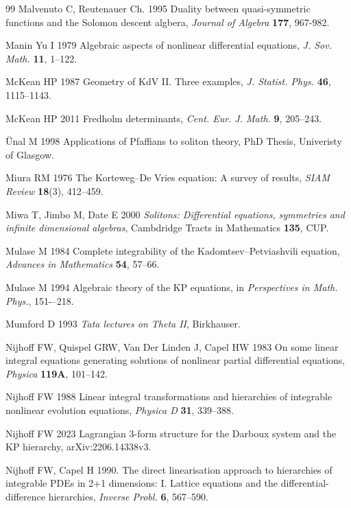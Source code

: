 \documentclass[5p,twocolumn]{elsarticle}
\begin{document}
\begin{thebibliography}{99}
 Malvenuto C, Reutenauer Ch. 1995 Duality between quasi-symmetric functions and the Solomon descent algbera, \textit{Journal of Algebra} \textbf{177}, 967-982.
  
 Manin Yu I 1979 Algebraic aspects of nonlinear differential equations, \textit{J. Sov. Math.} \textbf{11}, 1--122.


 McKean HP 1987 Geometry of KdV II. Three examples, \textit{J. Statist. Phys.\/} \textbf{46}, 1115--1143.  

 McKean HP 2011 Fredholm determinants, \textit{Cent. Eur. J. Math.\/} \textbf{9}, 205--243.

 \"Unal M 1998 Applications of Pfaffians to soliton theory, PhD Thesis, Univeristy of Glasgow.

 Miura RM 1976 The Korteweg--De Vries equation: A survey of results, \textit{SIAM Review} \textbf{18}(3), 412--459.
  
 Miwa T, Jimbo M, Date E 2000 \textit{Solitons: Differential equations, symmetries and infinite dimensional algebras}, Cambdridge Tracts in Mathematics \textbf{135}, CUP.

 Mulase M 1984 Complete integrability of the Kadomtsev--Petviashvili equation, \textit{Advances in Mathematics} \textbf{54}, 57--66.  
  
 Mulase M 1994 Algebraic theory of the KP equations, in \textit{Perspectives in Math. Phys.\/}, 151-–218.  

 Mumford D 1993 \textit{Tata lectures on Theta II}, Birkhauser.

 Nijhoff FW, Quispel GRW, Van Der Linden J, Capel HW 1983 On some linear integral equations generating solutions of nonlinear partial differential equations, \textit{Physica} \textbf{119A}, 101--142.  

 Nijhoff FW 1988 Linear integral transformations and hierarchies of integrable nonlinear evolution equations, \textit{Physica D} \textbf{31}, 339--388.

 Nijhoff FW 2023 Lagrangian $3$-form structure for the Darboux system and the KP hierarchy, arXiv:2206.14338v3.
  
 Nijhoff FW, Capel H 1990. The direct linearisation approach to hierarchies of integrable PDEs in 2+1 dimensions: I. Lattice equations and the differential-difference hierarchies,
  \textit{Inverse Probl.\/} \textbf{6}, 567--590.


\end{thebibliography}
\end{document}
